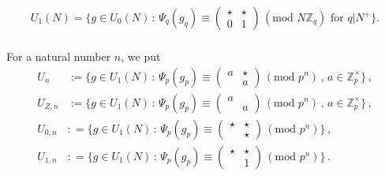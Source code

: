 \documentclass{amsart}
\numberwithin{equation}{section}
\newcommand{\Zp}{\mathbb{Z}_p}
\newcommand{\ZZ}{\mathbb{Z}}
\begin{document}
$$U_1( N) = \{ g \in U_0(N)\,:\, \Psi_q(g_q) \equiv \left( \begin{smallmatrix}
    \star & \star \\ 0 & 1
\end{smallmatrix} \right)\, (\text{mod } N \ZZ_q ) \text{ for } q| N^+ \}. $$


\vspace{-0.1cm}

\subsubsection{} For a natural number $n$, we put
 \begin{align}
   \label{eqn_new_level}
     U_n &:= \{ g \in U_1(N) \,:\, \Psi_p(g_p) \equiv \left( \begin{smallmatrix} a & \star  \\  & a \end{smallmatrix}\right)\, (\text{mod } p^n)\, ,\,a \in\Zp^\times\}\,, \\
 \label{eqn_2024_07_31_1640}
     U_{Z,n}  &:= \{ g \in U_1(N) \,:\, \Psi_p(g_p) \equiv \left( \begin{smallmatrix} a &  \\  & a \end{smallmatrix}\right)\, (\text{mod } p^n)\, ,\,a \in\Zp^\times\}\,, 
\\
 \label{eqn_2024_07_31_1649}
     U_{0,n} &: = \{ g \in U_1(N)  \,:\, \Psi_p(g_p) \equiv \left( \begin{smallmatrix} \star & \star \\  & \star \end{smallmatrix}\right)\, (\text{mod } p^n)\}\,,
\\
 \label{eqn_2024_07_31_1650}
     U_{1,n} &: = \{ g \in  U_1(N)  \,:\, \Psi_p(g_p) \equiv \left( \begin{smallmatrix} \star &  \star \\  & 1 \end{smallmatrix}\right)\, (\text{mod } p^n)\}\,.
 \end{align}
\end{document}
